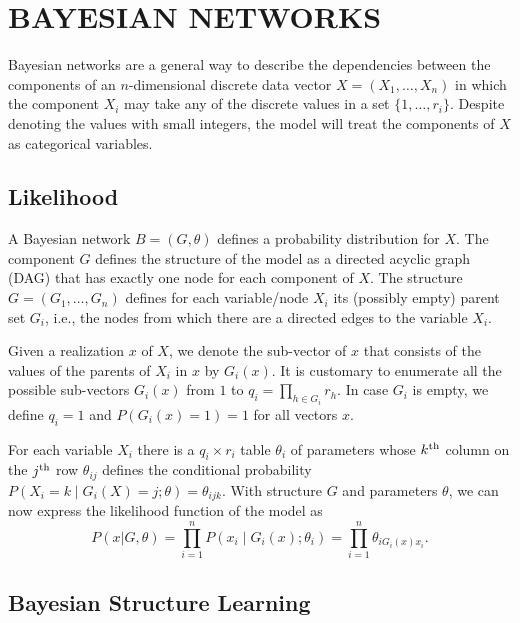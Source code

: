 \section{BAYESIAN NETWORKS}
\label{sec:bns}

Bayesian networks are a general way to describe the dependencies
between the components of an $n$\nobreakdash-dimensional discrete data
vector $X=(X_{1},\ldots,X_{n})$ in which the component $X_{i}$ may
take any of the discrete values in a set $\{1,\ldots,r_{i}\}$.
Despite denoting the values with small integers, the model will treat
the components of $X$ as categorical variables.


\subsection{Likelihood}
\label{ssec:likelihood}

A Bayesian network $B=(G,\theta)$ defines a probability distribution for
$X$. The component $G$ defines the structure of the model as a
directed acyclic graph (DAG) that has exactly one node for each component of
$X$. The structure $G=(G_{1},\ldots,G_{n})$ defines for each
variable/node $X_{i}$ its (possibly empty) parent set $G_{i}$, i.e.,
the nodes from which there are a directed edges to the variable
$X_{i}$.

Given a realization $x$ of $X$, we denote the sub\nobreakdash-vector
of $x$ that consists of the values of the parents of $X_{i}$ in $x$ by
$G_{i}(x)$. It is customary to enumerate all the possible
sub\nobreakdash-vectors $G_{i}(x)$ from $1$ to $q_{i}=\prod_{h\in
  G_{i}}r_{h}.$ In case $G_{i}$ is empty, we define $q_{i}=1$ and
$P(G_{i}(x)=1)=1$ for all vectors $x$.

For each variable $X_{i}$ there is a $q_{i}\times r_{i}$ table
$\theta_{i}$ of parameters whose $k^{\textnormal{th}}$ column
on the $j^{\textnormal{th}}$ row $\theta_{ij}$ defines the conditional
probability $P(X_{i}=k\mid G_{i}(X)=j;\theta)=\theta_{ijk}$.  With
structure $G$ and parameters $\theta$, we can now express the
likelihood function of the model as
\begin{equation}
P(x|G,\theta)=\prod_{i=1}^{n}P(x_{i}\mid
G_{i}(x);\theta_{i})=\prod_{i=1}^{n}\theta_{iG_{i}(x)x_{i}}.
\end{equation}



\subsection{Bayesian Structure Learning}

